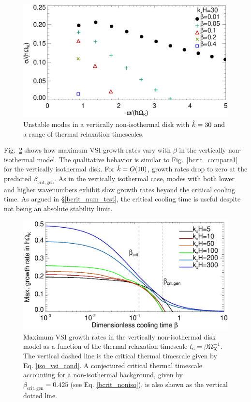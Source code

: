 \begin{figure}
  \includegraphics[width=\linewidth,clip=true,trim=0cm 0cm 0cm
  0cm]{figures/compare_modes_Gam1.3_kx30.ps}
  \caption{Unstable modes in a vertically non-isothermal disk with
    $\hat{k}=30$ and a range of thermal relaxation timescales.  
    \label{compare_modes_vnoniso_kx10}}
\end{figure} 

Fig.\ \ref{bcrit_compare2} shows how maximum VSI growth
rates vary with $\beta$ in the vertically non-isothermal model. The qualitative
behavior is similar to Fig.\ \ref{bcrit_compare1} for the vertically
isothermal disk. For $\hat{k}=O(10)$, growth rates drop to zero at the
predicted $\beta_\mathrm{crit,gen}$.  As in the vertically isothermal case,
modes with both lower and higher wavenumbers  exhibit slow growth rates 
beyond the critical cooling time. As argued in \S\ref{bcrit_num_test},
the critical cooling time is useful despite not being an absolute stability limit.

\begin{figure}
  \includegraphics[scale=0.4415]{figures/gcorr_compare_vnoniso_maxrate2} 
  \caption{Maximum VSI growth rates in the vertically non-isothermal disk
    model as a function of the thermal relaxation timescale
    $t_c=\beta\Omega_{\rm K}^{-1}$. The vertical dashed line is the critical thermal
    timescale given by Eq. \ref{iso_vsi_cond}. A conjectured critical thermal
    timescale accounting for a non-isothermal background, given by 
     $\beta_\mathrm{crit,gen}= 0.425$ (see Eq. \ref{bcrit_noniso}),   
    is also shown as the vertical dotted line. 
    \label{bcrit_compare2}}   
\end{figure} 

